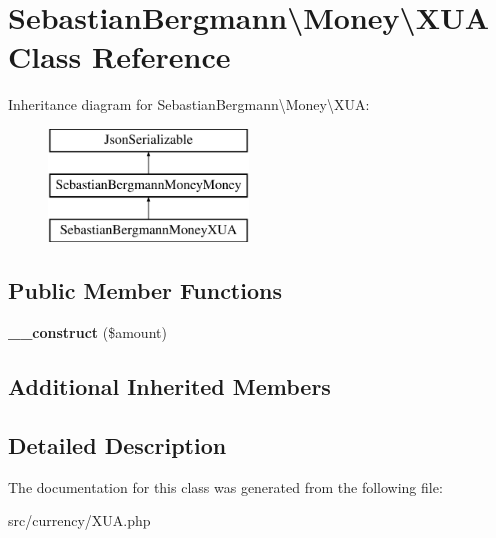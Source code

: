 \hypertarget{classSebastianBergmann_1_1Money_1_1XUA}{}\section{Sebastian\+Bergmann\textbackslash{}Money\textbackslash{}X\+U\+A Class Reference}
\label{classSebastianBergmann_1_1Money_1_1XUA}
Inheritance diagram for Sebastian\+Bergmann\textbackslash{}Money\textbackslash{}X\+U\+A\+:\begin{figure}[H]
\begin{center}
\leavevmode
\includegraphics[height=3.000000cm]{classSebastianBergmann_1_1Money_1_1XUA}
\end{center}
\end{figure}
\subsection*{Public Member Functions}
\begin{DoxyCompactItemize}
\item 
\hypertarget{classSebastianBergmann_1_1Money_1_1XUA_a8b6f5377ec3d5b5928d3da6edbae89cd}{}{\bfseries \+\_\+\+\_\+construct} (\$amount)\label{classSebastianBergmann_1_1Money_1_1XUA_a8b6f5377ec3d5b5928d3da6edbae89cd}

\end{DoxyCompactItemize}
\subsection*{Additional Inherited Members}


\subsection{Detailed Description}


The documentation for this class was generated from the following file\+:\begin{DoxyCompactItemize}
\item 
src/currency/X\+U\+A.\+php\end{DoxyCompactItemize}
